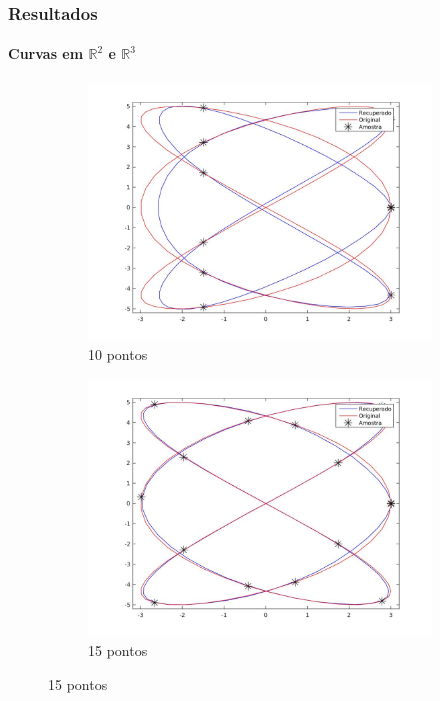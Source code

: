 \begin{frame}
\frametitle{Resultados}
\framesubtitle{Curvas em $\mathbb{R}^2$ e $\mathbb{R}^3$}

\begin{figure}
	\centering
	\begin{subfigure}[b]{0.31\textwidth}
		\centering
		\includegraphics[trim={5cm 2cm 3cm 2cm},clip,width=\textwidth]{img/rep_2_10.jpg}
		\caption{10 pontos}
		\label{fig:ex24}
	\end{subfigure}
	\hfill
	\begin{subfigure}[b]{0.31\textwidth}
		\centering
		\includegraphics[trim={5cm 2cm 3cm 2cm},clip,width=\textwidth]{img/rep_2_15.jpg}
		\caption{15 pontos}
		\label{fig:ex22}

\end{subfigure}
\end{figure}
\end{frame}
